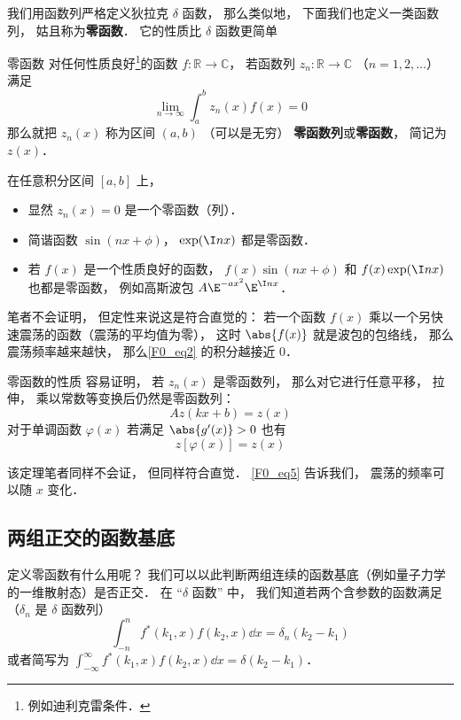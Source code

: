 
我们用函数列严格定义狄拉克 $\delta$ 函数， 那么类似地， 下面我们也定义一类函数列， 姑且称为\textbf{零函数}． 它的性质比 $\delta$ 函数更简单
\begin{definition}{零函数}
对任何性质良好\footnote{例如迪利克雷条件．}的函数 $f: \mathbb R \to \mathbb C$， 若函数列 $z_n: \mathbb R \to \mathbb C$ （$n = 1, 2, \dots$） 满足
\begin{equation}\label{F0_eq2}
\lim_{n\to \infty}\int_{a}^{b} z_n(x) f(x) = 0
\end{equation}
那么就把 $z_n(x)$ 称为区间 $(a,b)$ （可以是无穷） \textbf{零函数列}或\textbf{零函数}， 简记为 $z(x)$．
\end{definition}

\begin{example}{}\label{F0_ex1}
在任意积分区间 $[a,b]$ 上，
\begin{itemize}
\item 显然 $z_n(x) = 0$ 是一个零函数（列）．
\item 简谐函数 $\sin(nx + \phi)$， $\exp(\I n x)$ 都是零函数．
\item 若 $f(x)$ 是一个性质良好的函数， $f(x)\sin(nx + \phi)$ 和 $f(x)\exp(\I n x)$ 也都是零函数， 例如高斯波包 $A\E^{-ax^2}\E^{\I nx}$．
\end{itemize}

笔者不会证明， 但定性来说这是符合直觉的： 若一个函数 $f(x)$ 乘以一个另快速震荡的函数（震荡的平均值为零）， 这时 $\abs{f(x)}$ 就是波包的包络线， 那么震荡频率越来越快， 那么\autoref{F0_eq2} 的积分越接近 $0$．
\end{example}

\begin{theorem}{零函数的性质}
容易证明， 若 $z_n(x)$ 是零函数列， 那么对它进行任意平移， 拉伸， 乘以常数等变换后仍然是零函数列：
\begin{equation}
A z(kx + b) = z(x)
\end{equation}
对于单调函数 $\varphi(x)$ 若满足 $\abs{g'(x)} > 0$ 也有
\begin{equation}\label{F0_eq5}
z[\varphi(x)] = z(x)
\end{equation}
\end{theorem}
该定理笔者同样不会证， 但同样符合直觉． \autoref{F0_eq5} 告诉我们， 震荡的频率可以随 $x$ 变化．

\subsection{两组正交的函数基底}
定义零函数有什么用呢？ 我们可以以此判断两组连续的函数基底（例如量子力学的一维散射态）是否正交． 在 “$\delta$ 函数” 中， 我们知道若两个含参数的函数满足（$\delta_n$ 是 $\delta$ 函数列）
\begin{equation}\label{F0_eq1}
\int_{-n}^{n} f^*(k_1, x) f(k_2, x)\dd{x} = \delta_n(k_2 - k_1)
\end{equation}
或者简写为 $\int_{-\infty}^{\infty} f^*(k_1, x) f(k_2, x)\dd{x} = \delta(k_2 - k_1)$．

